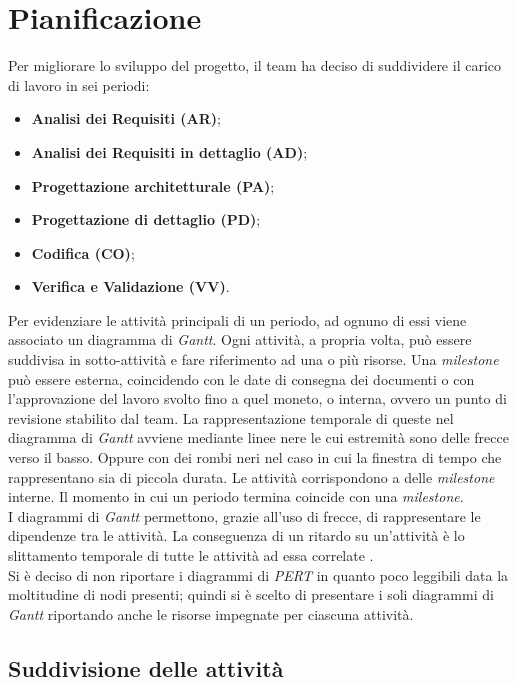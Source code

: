 \newpage
\section{Pianificazione}
Per migliorare lo sviluppo del progetto, il team ha deciso di suddividere il carico di lavoro in sei periodi:
\begin{itemize}
	\item \textbf{Analisi dei Requisiti (AR)};
	\item \textbf{Analisi dei Requisiti in dettaglio (AD)};
	\item \textbf{Progettazione architetturale (PA)};
	\item \textbf{Progettazione di dettaglio (PD)};
	\item \textbf{Codifica (CO)};
	\item \textbf{Verifica e Validazione (VV)}.
\end{itemize}

Per evidenziare le attività principali di un periodo, ad ognuno di essi viene associato un diagramma di \textit{Gantt}. 
Ogni attività, a propria volta, può essere suddivisa in sotto-attività e fare riferimento ad una o più risorse.
Una \textit{milestone} può essere esterna, coincidendo con le date di consegna dei documenti o con l'approvazione del lavoro svolto fino a quel moneto, o interna, ovvero un punto di revisione stabilito dal team. 
La rappresentazione temporale di queste nel diagramma di \textit{Gantt} avviene mediante linee nere le cui estremità sono delle frecce verso il basso. 
Oppure con dei rombi neri nel caso in cui la finestra di tempo che rappresentano sia di piccola durata. 
Le attività corrispondono a delle \textit{milestone} interne. 
Il momento in cui un periodo termina coincide con una \textit{milestone}.\\
I diagrammi di \textit{Gantt} permettono, grazie all'uso di frecce, di rappresentare le dipendenze tra le attività.
La conseguenza di un ritardo su un'attività è lo slittamento temporale di tutte le attività ad essa correlate . \\
Si è deciso di non riportare i diagrammi di \textit{PERT} in quanto poco leggibili data la moltitudine
di nodi presenti; quindi si è scelto di presentare i soli diagrammi di \textit{Gantt} riportando anche le
risorse impegnate per ciascuna attività.

\subsection{Suddivisione delle attività}

